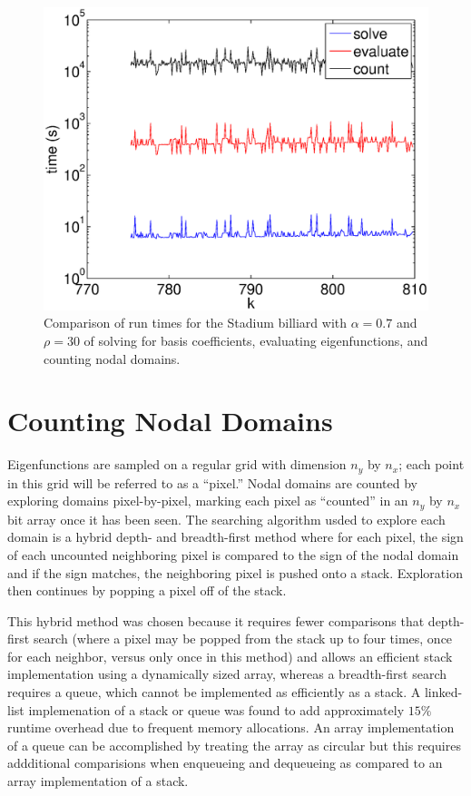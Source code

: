 \documentclass{report}
\begin{document}
\begin{figure}
  \begin{center}
    \includegraphics[width=\textwidth]{figs/timing/qust_700_to_900_partial_timing.eps}
    \caption{Comparison of run times for the Stadium billiard with $\alpha = 0.7$ and $\rho = 30$ of solving for basis coefficients, evaluating eigenfunctions, and counting nodal domains.}
    \label{fig:timing}
  \end{center}
\end{figure}

\section{Counting Nodal Domains}
\label{sec:counting}
Eigenfunctions are sampled on a regular grid with dimension $n_{y}$ by $n_{x}$; each point in this grid will be referred to as a ``pixel.'' Nodal domains are counted by exploring domains pixel-by-pixel, marking each pixel as ``counted'' in an $n_{y}$ by $n_{x}$ bit array once it has been seen. The searching algorithm usded to explore each domain is a hybrid depth- and breadth-first method where for each pixel, the sign of each uncounted neighboring pixel is compared to the sign of the nodal domain and if the sign matches, the neighboring pixel is pushed onto a stack. Exploration then continues by popping a pixel off of the stack.

This hybrid method was chosen because it requires fewer comparisons that depth-first search (where a pixel may be popped from the stack up to four times, once for each neighbor, versus only once in this method) and allows an efficient stack implementation using a dynamically sized array, whereas a breadth-first search requires a queue, which cannot be implemented as efficiently as a stack. A linked-list implemenation of a stack or queue was found to add approximately $15\%$ runtime overhead due to frequent memory allocations. An array implementation of a queue can be accomplished by treating the array as circular but this requires addditional comparisions when enqueueing and dequeueing as compared to an array implementation of a stack.
\end{document}

